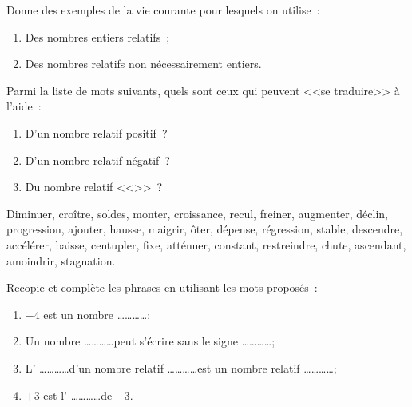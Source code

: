 

\begin{exercice}
Donne des exemples de la vie courante pour lesquels on utilise :
\begin{enumerate}
 \item Des nombres entiers relatifs ;
 \item Des nombres relatifs non nécessairement entiers.
 \end{enumerate}
\end{exercice}


\begin{exercice}[Interprétation]
Parmi la liste de mots suivants, quels sont ceux qui peuvent <<\;se traduire\;>> à l'aide : 
\begin{enumerate}
 \item D'un nombre relatif positif ?
 \item D'un nombre relatif négatif ?
 \item Du nombre relatif <<\;>> ?
 \end{enumerate}
 
Diminuer, croître, soldes, monter, croissance, recul, freiner, augmenter, déclin, progression, ajouter, hausse, maigrir, ôter, dépense, régression, stable, descendre, accélérer, baisse, centupler, fixe, atténuer, constant, restreindre, chute, ascendant, amoindrir, stagnation.
\end{exercice}


\begin{exercice}
Recopie et complète les phrases en utilisant les mots proposés :

 \quad {} \quad {} \quad {} \quad {}

\begin{enumerate}
 \item $- 4$ est un nombre \ldots \ldots \ldots \ldots ;
 \item Un nombre \ldots \ldots \ldots \ldots peut s'écrire sans le signe \ldots \ldots \ldots \ldots ;
 \item L' \ldots \ldots \ldots \ldots d'un nombre relatif \ldots \ldots \ldots \ldots est un nombre relatif \ldots \ldots \ldots \ldots ;
 \item $+ 3$ est l' \ldots \ldots \ldots \ldots de $- 3$.
 \end{enumerate}
\end{exercice}


